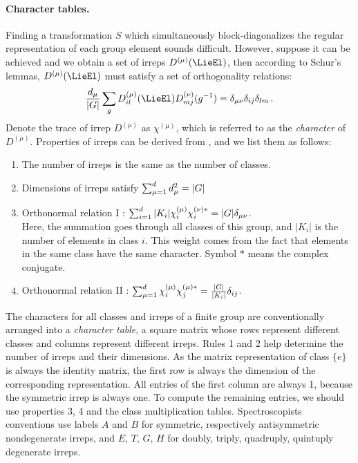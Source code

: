 \paragraph{Character tables.}
Finding a transformation $S$ which simultaneously block-diagonalizes the
regular representation of each group element sounds difficult.
However, suppose it can be achieved and we obtain a set of irreps $D^{(\mu)}(\LieEl)$,
then according to Schur's lemmas, $D^{(\mu)}(\LieEl)$ must satisfy a set of
orthogonality relations:
\begin{equation}
  \label{eq:ortho}
  \frac{d_\mu}{|G|} \sum_g D_{il}^{(\mu)}(\LieEl) D_{mj}^{(\nu)}(g^{-1}) = \delta_{\mu \nu}
  \delta_{ij} \delta_{lm}
  \,.
\end{equation}
Denote the trace of irrep $D^{(\mu)}$ as $\chi^{(\mu)}$, which is referred to as
the \emph{character} of $D^{(\mu)}$. Properties of irreps can be derived from
, and we list them as follows:
\begin{enumerate}
\item The number of irreps is the same as the number of
  classes.
\item Dimensions of irreps satisfy
  $\sum_{\mu=1}^{d} d^2_\mu = |G| $
\item Orthonormal relation I :
  $\sum_{i=1}^{d} |K_i| \chi_i^{(\mu)} \chi_i^{(\nu)*} = |G|\delta_{\mu \nu} $. \\
  Here, the summation goes through all classes of this group, and $|K_i|$ is
  the number of elements in class $i$. This weight comes from the fact that
  elements in the same class have the same character. Symbol $*$ means
  the complex conjugate.
\item Orthonormal relation II :
  $\sum_{\mu=1}^{d} \chi_i^{(\mu)} \chi_j^{(\mu)*} = \frac{|G|}{|K_i|}\delta_{ij} $. \\
\end{enumerate}
The characters for all classes and irreps of a finite group are
conventionally arranged into a \emph{character table}, a square matrix
whose rows represent different
classes and columns represent different irreps.
Rules 1 and 2 help determine the number of irreps and
their dimensions. As the matrix representation of class $\{e\}$ is always the
identity matrix, the first row is always the dimension of the
corresponding representation. All entries of the first column are always 1,
because the symmetric irrep is always one\dmn. To compute the
remaining entries, we should use properties 3, 4 and the class multiplication
tables.   Spectroscopists conventions use labels $A$ and $B$ for
symmetric, respectively antisymmetric nondegenerate irreps, and
$E$, $T$, $G$, $H$ for doubly, triply, quadruply, quintuply degenerate irreps.

